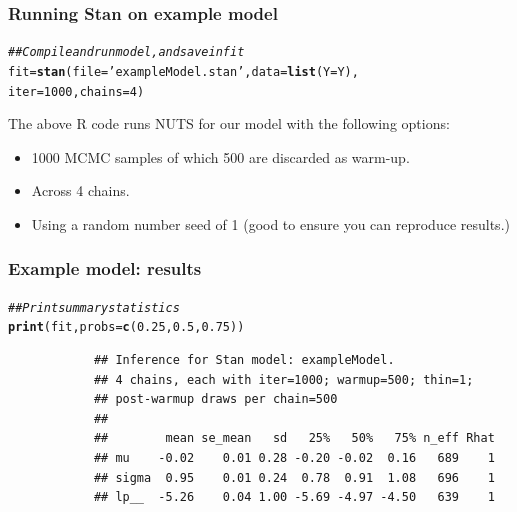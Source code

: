 \documentclass[handout]{beamer}
\makeatletter
\newcommand{\hlnum}[1]{\textcolor[rgb]{0.686,0.059,0.569}{#1}}%
\newcommand{\hlstr}[1]{\textcolor[rgb]{0.192,0.494,0.8}{#1}}%
\newcommand{\hlcom}[1]{\textcolor[rgb]{0.678,0.584,0.686}{\textit{#1}}}%
\newcommand{\hlstd}[1]{\textcolor[rgb]{0.345,0.345,0.345}{#1}}%
\newcommand{\hlkwb}[1]{\textcolor[rgb]{0.69,0.353,0.396}{#1}}%
\newcommand{\hlkwc}[1]{\textcolor[rgb]{0.333,0.667,0.333}{#1}}%
\newcommand{\hlkwd}[1]{\textcolor[rgb]{0.737,0.353,0.396}{\textbf{#1}}}%
\newenvironment{kframe}{%
	\def\at@end@of@kframe{}%
	\ifinner\ifhmode%
	\def\at@end@of@kframe{\end{minipage}}%
\begin{minipage}{\columnwidth}%
	\fi\fi%
	\def\FrameCommand##1{\hskip\@totalleftmargin \hskip-\fboxsep
		\colorbox{shadecolor}{##1}\hskip-\fboxsep
		\hskip-\linewidth \hskip-\@totalleftmargin \hskip\columnwidth}%
	\MakeFramed {\advance\hsize-\width
		\@totalleftmargin\z@ \linewidth\hsize
		\@setminipage}}%
{\par\unskip\endMakeFramed%
	\at@end@of@kframe}
\newenvironment{knitrout}{}{} %
\makeatother
\begin{document}
\begin{frame}[fragile]
\frametitle{Running Stan on example model}
\begin{knitrout}\footnotesize
	\color{fgcolor}\begin{kframe}
		\begin{alltt}
			\hlcom{## Compile and run model, and save in fit}
			\hlstd{fit} \hlkwb{=} \hlkwd{stan}\hlstd{(}\hlkwc{file}\hlstd{=}\hlstr{'exampleModel.stan'}\hlstd{,}\hlkwc{data}\hlstd{=}\hlkwd{list}\hlstd{(}\hlkwc{Y}\hlstd{=Y),}
			            \hlkwc{iter}\hlstd{=}\hlnum{1000}\hlstd{,}\hlkwc{chains}\hlstd{=}\hlnum{4}\hlstd{)}
		\end{alltt}
	\end{kframe}
\end{knitrout}

The above R code runs NUTS for our model with the following options:
\begin{itemize}
\item<3-> 1000 MCMC samples of which 500 are discarded as warm-up.
\item<4-> Across 4 chains.
\item<5-> Using a random number seed of 1 (good to ensure you can reproduce results.)
\end{itemize}

\end{frame}

\begin{frame}[fragile]
\frametitle{Example model: results}
	\begin{knitrout}\small
		\color{fgcolor}\begin{kframe}
			\begin{alltt}
				\hlcom{## Print summary statistics}
				\hlkwd{print}\hlstd{(fit,}\hlkwc{probs} \hlstd{=} \hlkwd{c}\hlstd{(}\hlnum{0.25}\hlstd{,} \hlnum{0.5}\hlstd{,} \hlnum{0.75}\hlstd{))}
			\end{alltt}
			\begin{verbatim}
			## Inference for Stan model: exampleModel.
			## 4 chains, each with iter=1000; warmup=500; thin=1; 
			## post-warmup draws per chain=500
			## 
			##        mean se_mean   sd   25%   50%   75% n_eff Rhat
			## mu    -0.02    0.01 0.28 -0.20 -0.02  0.16   689    1
			## sigma  0.95    0.01 0.24  0.78  0.91  1.08   696    1
			## lp__  -5.26    0.04 1.00 -5.69 -4.97 -4.50   639    1
			\end{verbatim}
		\end{kframe}
	\end{knitrout}
\end{frame}
\end{document}
